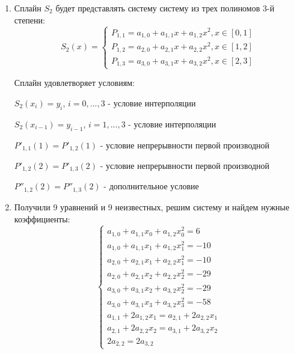 \documentclass[a4paper,12pt]{article} %
\begin{document}
\begin{enumerate}

\item Сплайн $S_2$ будет представлять систему систему из трех полиномов 3-й степени:
\begin{equation*}
    S_2(x) =
    \begin{cases}
        P_{1, 1} = a_{1, 0} + a_{1, 1}x + a_{1, 2}x^2, x \in [0, 1]\\
        P_{1, 2} = a_{2, 0} + a_{2, 1}x + a_{2, 2}x^2, x \in [1, 2]\\
        P_{1, 3} = a_{3, 0} + a_{3, 1}x + a_{3, 2}x^2, x \in [2, 3]
    \end{cases}
\end{equation*}

Сплайн удовлетворяет условиям:

$S_2(x_i) = y_i$, $i = 0, ..., 3$ - условие интерполяции

$S_2(x_{i - 1}) = y_{i - 1}$, $i = 1, ..., 3$ - условие интерполяции

$P'_{1, 1}(1) = P'_{1, 2}(1)$ - условие непрерывности первой производной

$P'_{1, 2}(2) = P'_{1, 3}(2)$ - условие непрерывности первой производной

$P''_{1, 2}(2) = P''_{1, 3}(2)$ - дополнительное условие

\newpage

\item Получили 9 уравнений и 9 неизвестных, решим систему и найдем нужные коэффициенты:
\begin{equation*}
    \begin{cases}
        a_{1, 0} + a_{1, 1}x_0 + a_{1, 2}x_0^2 = 6 \\
        a_{1, 0} + a_{1, 1}x_1 + a_{1, 2}x_1^2 = -10 \\
        a_{2, 0} + a_{2, 1}x_1 + a_{2, 2}x_1^2 = -10 \\
        a_{2, 0} + a_{2, 1}x_2 + a_{2, 2}x_2^2 = -29 \\
        a_{3, 0} + a_{3, 1}x_2 + a_{3, 2}x_2^2 = -29 \\
        a_{3, 0} + a_{3, 1}x_3 + a_{3, 2}x_3^2 = -58 \\
        a_{1, 1} + 2a_{1, 2}x_1 = a_{2, 1} + 2a_{2, 2}x_1 \\
        a_{2, 1} + 2a_{2, 2}x_2 = a_{3, 1} + 2a_{3, 2}x_2 \\
        2a_{2, 2} = 2a_{3, 2}
    \end{cases}
\end{equation*}


\end{enumerate}
\end{document}
